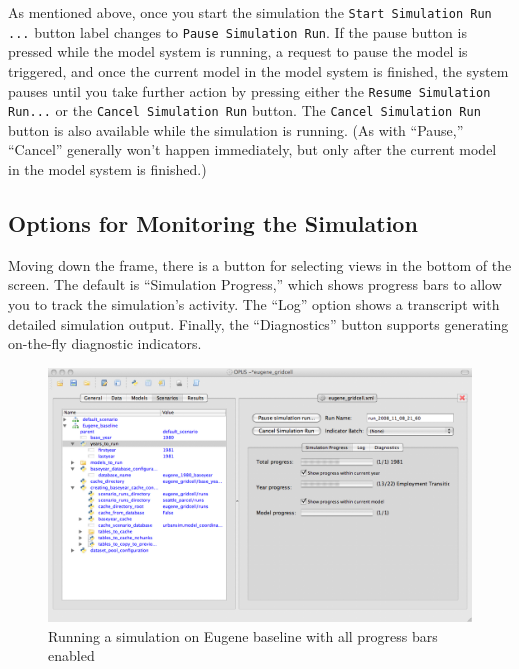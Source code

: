 As mentioned above, once you start the simulation the
\verb#Start Simulation Run ...# button label changes to
\verb#Pause Simulation Run#\@.  If the pause button is pressed while the
model system is running, a request to pause the model is triggered, and
once the current model in the model system is finished, the system pauses
until you take further action by pressing either the
\verb#Resume Simulation Run...# or the \verb#Cancel Simulation Run# button.
The \verb#Cancel Simulation Run# button is also available while the
simulation is running.  (As with ``Pause,'' ``Cancel'' generally won't
happen immediately, but only after the current model in the model system is
finished.)

\subsection{Options for Monitoring the Simulation}
\label{sec:monitoring-simulation}

Moving down the frame, there is a button for selecting views in the bottom
of the screen.  The default is ``Simulation Progress,''  which shows
progress bars to allow you to track the simulation's activity.  The ``Log''
option shows a transcript with detailed simulation output.  Finally, the
``Diagnostics'' button supports generating on-the-fly diagnostic
indicators.  

\begin{figure}[htp]
\begin{center}
\includegraphics[scale=0.4]{part-gui/images/scenario-manager-progress-bars.png}
\end{center}
\caption{Running a simulation on Eugene baseline with all progress bars
  enabled}
\label{fig:scenario-manager-progress-bars}
\end{figure}

